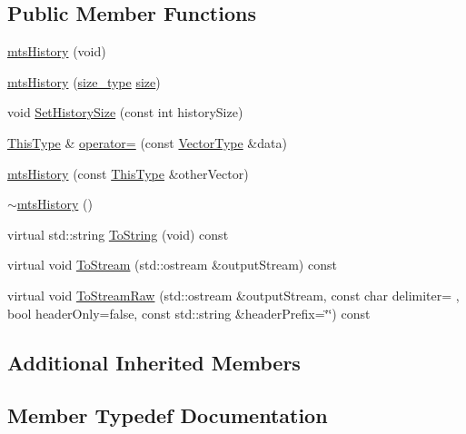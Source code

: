 \subsection*{Public Member Functions}
\begin{DoxyCompactItemize}
\item 
\hyperlink{classmts_history_ad99222e10e0961b5938b4ecbc2a77d4a}{mts\+History} (void)
\item 
\hyperlink{classmts_history_a0b0a6c292dc53619d138594f30d278b5}{mts\+History} (\hyperlink{classmts_history_aca985b1dbd39cc61816674edc9aee0cc}{size\+\_\+type} \hyperlink{classvct_dynamic_const_vector_base_a79950d8cced7fd4e790d9ac2ca1c43a7}{size})
\item 
void \hyperlink{classmts_history_a54b3dbc86d832adb007a36cc81c8ba24}{Set\+History\+Size} (const int history\+Size)
\item 
\hyperlink{classvct_dynamic_const_vector_base_a39da273523717f678f54d3321ebca3dd}{This\+Type} \& \hyperlink{classmts_history_a9d414d17927ef7f0ee2952014be86a54}{operator=} (const \hyperlink{classmts_history_a7ccb818e85025368eb6ccdb5423453a3}{Vector\+Type} \&data)
\item 
\hyperlink{classmts_history_a0b4dccf680335b32142db61583ea69e0}{mts\+History} (const \hyperlink{classvct_dynamic_const_vector_base_a39da273523717f678f54d3321ebca3dd}{This\+Type} \&other\+Vector)
\item 
\hyperlink{classmts_history_a0d9b57533e945c9f577f2cf1c9635c61}{$\sim$mts\+History} ()
\item 
virtual std\+::string \hyperlink{classmts_history_ab3afbb2532e89c7ed44aa6e6948d06d2}{To\+String} (void) const 
\item 
virtual void \hyperlink{classmts_history_ae2ea86c07b3aefc568c6f89ee6d5b2b6}{To\+Stream} (std\+::ostream \&output\+Stream) const 
\item 
virtual void \hyperlink{classmts_history_ac9942da54614bef7fd604bc1ec1b2593}{To\+Stream\+Raw} (std\+::ostream \&output\+Stream, const char delimiter= \textquotesingle{} \textquotesingle{}, bool header\+Only=false, const std\+::string \&header\+Prefix=\char`\"{}\char`\"{}) const 
\end{DoxyCompactItemize}
\subsection*{Additional Inherited Members}


\subsection{Member Typedef Documentation}
\hypertarget{classmts_history_aca985b1dbd39cc61816674edc9aee0cc}{}
